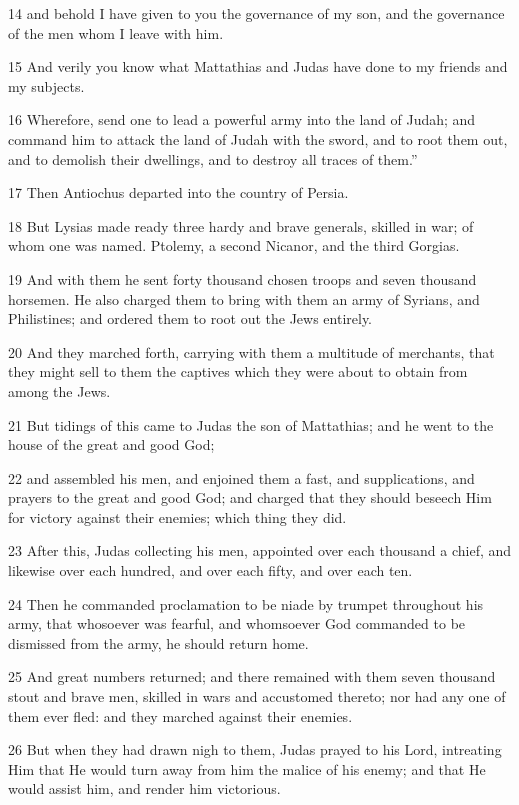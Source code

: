 14 and behold I have given to you the governance of my son, and the governance of the men whom I leave with him. 

15 And verily you know what Mattathias and Judas have done to my friends and my subjects. 

16 Wherefore, send one to lead a powerful army into the land of Judah; and command him to attack the land of Judah with the sword, and to root them out, and to demolish their dwellings, and to destroy all traces of them.” 

17 Then Antiochus departed into the country of Persia. 

18 But Lysias made ready three hardy and brave generals, skilled in war; of whom one was named. Ptolemy, a second Nicanor, and the third Gorgias. 

19 And with them he sent forty thousand chosen troops and seven thousand horsemen. He also charged them to bring with them an army of Syrians, and Philistines; and ordered them to root out the Jews entirely. 

20 And they marched forth, carrying with them a multitude of merchants, that they might sell to them the captives which they were about to obtain from among the Jews. 

21 But tidings of this came to Judas the son of Mattathias; and he went to the house of the great and good God; 

22 and assembled his men, and enjoined them a fast, and supplications, and prayers to the great and good God; and charged that they should beseech Him for victory against their enemies; which thing they did. 

23 After this, Judas collecting his men, appointed over each thousand a chief, and likewise over each hundred, and over each fifty, and over each ten. 

24 Then he commanded proclamation to be niade by trumpet throughout his army, that whosoever was fearful, and whomsoever God commanded to be dismissed from the army, he should return home. 

25 And great numbers returned; and there remained with them seven thousand stout and brave men, skilled in wars and accustomed thereto; nor had any one of them ever fled: and they marched against their enemies. 

26 But when they had drawn nigh to them, Judas prayed to his Lord, intreating Him that He would turn away from him the malice of his enemy; and that He would assist him, and render him victorious. 

